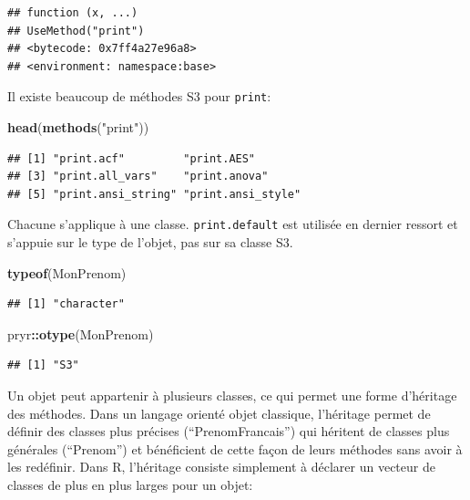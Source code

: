 \documentclass[
  12pt,
  french,
  a4paper,
  extrafontsizes,onecolumn,openright
  ]{memoir}
\newenvironment{Shaded}{\begin{snugshade}}{\end{snugshade}}
\newcommand{\KeywordTok}[1]{\textcolor[rgb]{0.13,0.29,0.53}{\textbf{#1}}}
\newcommand{\NormalTok}[1]{#1}
\newcommand{\OperatorTok}[1]{\textcolor[rgb]{0.81,0.36,0.00}{\textbf{#1}}}
\newcommand{\StringTok}[1]{\textcolor[rgb]{0.31,0.60,0.02}{#1}}
\begin{document}
\begin{verbatim}
## function (x, ...) 
## UseMethod("print")
## <bytecode: 0x7ff4a27e96a8>
## <environment: namespace:base>
\end{verbatim}

\normalsize

Il existe beaucoup de méthodes S3 pour \texttt{print}:

\scriptsize

\begin{Shaded}
\begin{Highlighting}[]
\KeywordTok{head}\NormalTok{(}\KeywordTok{methods}\NormalTok{(}\StringTok{"print"}\NormalTok{))}
\end{Highlighting}
\end{Shaded}

\begin{verbatim}
## [1] "print.acf"         "print.AES"        
## [3] "print.all_vars"    "print.anova"      
## [5] "print.ansi_string" "print.ansi_style"
\end{verbatim}

\normalsize

Chacune s'applique à une classe. \texttt{print.default} est utilisée en dernier ressort et s'appuie sur le type de l'objet, pas sur sa classe S3.

\scriptsize

\begin{Shaded}
\begin{Highlighting}[]
\KeywordTok{typeof}\NormalTok{(MonPrenom)}
\end{Highlighting}
\end{Shaded}

\begin{verbatim}
## [1] "character"
\end{verbatim}

\begin{Shaded}
\begin{Highlighting}[]
\NormalTok{pryr}\OperatorTok{::}\KeywordTok{otype}\NormalTok{(MonPrenom)}
\end{Highlighting}
\end{Shaded}

\begin{verbatim}
## [1] "S3"
\end{verbatim}

\normalsize

Un objet peut appartenir à plusieurs classes, ce qui permet une forme d'héritage des méthodes.
Dans un langage orienté objet classique, l'héritage permet de définir des classes plus précises (\enquote{PrenomFrancais}) qui héritent de classes plus générales (\enquote{Prenom}) et bénéficient de cette façon de leurs méthodes sans avoir à les redéfinir.
Dans R, l'héritage consiste simplement à déclarer un vecteur de classes de plus en plus larges pour un objet:
\end{document}
